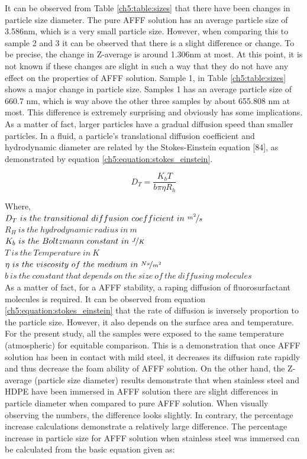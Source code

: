 \documentclass[12pt]{report}
\begin{document}
It can be observed from Table \ref{ch5:table:sizes} that there have been changes in particle size diameter. The pure AFFF solution has an average particle size of 3.586nm, which is a very small particle size. However, when comparing this to sample 2 and 3 it can be observed that there is a slight difference or change. To be precise, the change in Z-average is around 1.306nm at most. At this point, it is not known if these changes are slight in such a way that they do not have any effect on the properties of AFFF solution. Sample 1, in Table \ref{ch5:table:sizes} shows a major change in particle size. Samples 1 has an average particle size of 660.7 nm, which is way above the other three samples by about 655.808 nm at most. This difference is extremely surprising and obviously has some implications. As a matter of fact, larger particles have a gradual diffusion speed than smaller particles. In a fluid, a particle's translational diffusion coefficient and hydrodynamic diameter are related by the Stokes-Einstein equation [84], as demonstrated by equation \ref{ch5:equation:stokes_einstein}.

\begin{equation}
    D_T=\frac{K_bT}{b\pi \eta R_h}
    \label{ch5:equation:stokes_einstein}
\end{equation}

\noindent Where, \\
$D_T\ is\ the\ transitional\ diffusion\ coefficient\ in\ \nicefrac{m^2}{s}$ \\
$R_H\ is\ the\ hydrodynamic\ radius\ in\ m$ \\
$K_b\ is\ the\ Boltzmann\ constant\ in\ \nicefrac{J}{K}$ \\
$T\ is\ the\ Temperature\ in\ K$ \\
$\eta\ is\ the\ viscosity\ of\ the\ medium\ in\ \nicefrac{Ns}{m^2}$ \\
$b\ is\ the\ constant\ that\ depends\ on\ the\ size\ of\ the\ diffusing\ molecules$ \\

As a matter of fact, for a AFFF stability, a raping diffusion of fluorosurfactant molecules is required. It can be observed from equation \ref{ch5:equation:stokes_einstein} that the rate of diffusion is inversely proportion to the particle size. However, it also depends on the surface area and temperature. For the present study, all the samples were exposed to the same temperature (atmospheric) for equitable comparison. This is a demonstration that once AFFF solution has been in contact with mild steel, it decreases its diffusion rate rapidly and thus decrease the foam ability of AFFF solution.  On the other hand, the Z-average (particle size diameter) results demonstrate that when stainless steel and HDPE have been immersed in AFFF solution there are slight differences in particle diameter when compared to pure AFFF solution. When visually observing the numbers, the difference looks slightly. In contrary, the percentage increase calculations demonstrate a relatively large difference. The percentage increase in particle size for AFFF solution when stainless steel was immersed can be calculated from the basic equation given as: 
\end{document}
